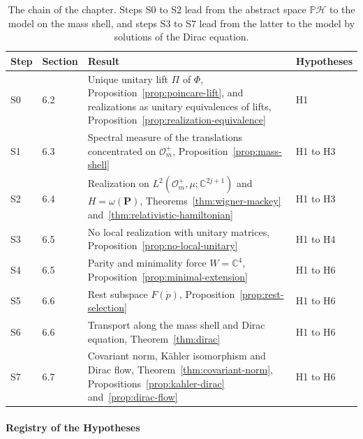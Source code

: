 \begin{table}[ht]
	\centering
	\small
	\renewcommand{\arraystretch}{1.25}
	\begin{tabular}{llp{7.6cm}l}
		\hline
		\textbf{Step} & \textbf{Section} & \textbf{Result} & \textbf{Hypotheses} \\
		\hline
		S0 & 6.2 & Unique unitary lift $\Pi$ of $\Phi$, Proposition~\ref{prop:poincare-lift}, and realizations as unitary equivalences of lifts, Proposition~\ref{prop:realization-equivalence} & H1 \\
		S1 & 6.3 & Spectral measure of the translations concentrated on $\mathcal{O}_m^+$, Proposition~\ref{prop:mass-shell} & H1 to H3 \\
		S2 & 6.4 & Realization on $L^2(\mathcal{O}_m^+,\mu;\mathbb{C}^{2j+1})$ and $H=\omega(\mathbf{P})$, Theorems~\ref{thm:wigner-mackey} and~\ref{thm:relativistic-hamiltonian} & H1 to H3 \\
		S3 & 6.5 & No local realization with unitary matrices, Proposition~\ref{prop:no-local-unitary} & H1 to H4 \\
		S4 & 6.5 & Parity and minimality force $W=\mathbb{C}^4$, Proposition~\ref{prop:minimal-extension} & H1 to H6 \\
		S5 & 6.6 & Rest subspace $F(\mathring{p})$, Proposition~\ref{prop:rest-selection} & H1 to H6 \\
		S6 & 6.6 & Transport along the mass shell and Dirac equation, Theorem~\ref{thm:dirac} & H1 to H6 \\
		S7 & 6.7 & Covariant norm, Kähler isomorphism and Dirac flow, Theorem~\ref{thm:covariant-norm}, Propositions~\ref{prop:kahler-dirac} and~\ref{prop:dirac-flow} & H1 to H6 \\
		\hline
	\end{tabular}
	\caption{The chain of the chapter. Steps S0 to S2 lead from the abstract space $\mathbb{P}\mathcal{H}$ to the model on the mass shell, and steps S3 to S7 lead from the latter to the model by solutions of the Dirac equation.}
	\label{tab:steps}
\end{table}

\paragraph{Registry of the Hypotheses}
\label{sec:dirac-summary}


